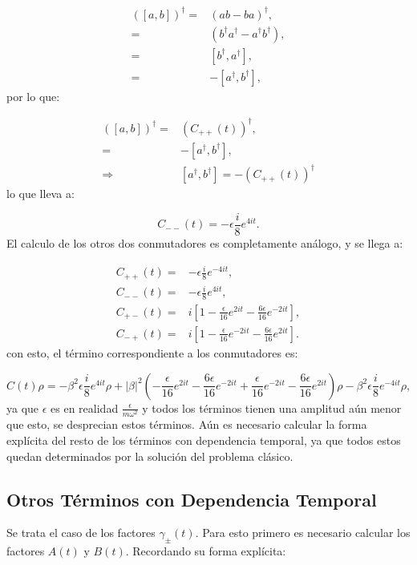 \documentclass[a4paper,10pt]{report}
\begin{document}
\begin{align*}
([a,b])^{\dagger} =& (ab-ba)^{\dagger}, \\
=& (b^{\dagger}a^{\dagger}-a^{\dagger}b^{\dagger}),\\
=& [b^{\dagger},a^{\dagger}],\\
=& -[a^{\dagger},b^{\dagger}], 
\end{align*} por lo que:

\begin{align*}
([a,b])^{\dagger} =& (C_{++}(t))^{\dagger},\\
=& -[a^{\dagger},b^{\dagger}],\\
\Rightarrow & [a^{\dagger},b^{\dagger}] = -(C_{++}(t))^{\dagger}
\end{align*} lo que lleva a:

\begin{equation*}
C_{--}(t) = -\epsilon\frac{i}{8}e^{4it}.
\end{equation*} El calculo de los otros dos conmutadores es completamente análogo, y se llega a:

\begin{align}
C_{++}(t) =& -\epsilon\frac{i}{8}e^{-4it},\\
C_{--}(t) =& -\epsilon\frac{i}{8}e^{4it},\\
C_{+-}(t) =& i [1 -\frac{\epsilon}{16}e^{2it}-\frac{6\epsilon}{16}e^{-2it}],\\
C_{-+}(t) =& i [1 -\frac{\epsilon}{16}e^{-2it}-\frac{6\epsilon}{16}e^{2it}].
\end{align} con esto, el término correspondiente a los conmutadores es:

\begin{equation}
C(t)\rho=-\beta^2\epsilon\frac{i}{8}e^{4it}\rho + |\beta|^2(-\frac{\epsilon}{16}e^{2it}-\frac{6\epsilon}{16}e^{-2it} + \frac{\epsilon}{16}e^{-2it}-\frac{6\epsilon}{16}e^{2it})\rho -\beta^2\epsilon\frac{i}{8}e^{-4it}\rho,
\end{equation} ya que $\epsilon$ es en realidad $\frac{\epsilon}{m\omega^2}$ y todos los términos tienen una amplitud aún menor que esto, se desprecian estos términos. Aún es necesario calcular la forma explícita del resto de los términos con dependencia temporal, ya que todos estos quedan determinados por la solución del problema clásico.

\subsection{Otros Términos con Dependencia Temporal}

Se trata el caso de los factores $\gamma_{\pm}(t)$. Para esto primero es necesario calcular los factores $A(t)$ y $B(t)$. Recordando su forma explícita:







\end{document}
